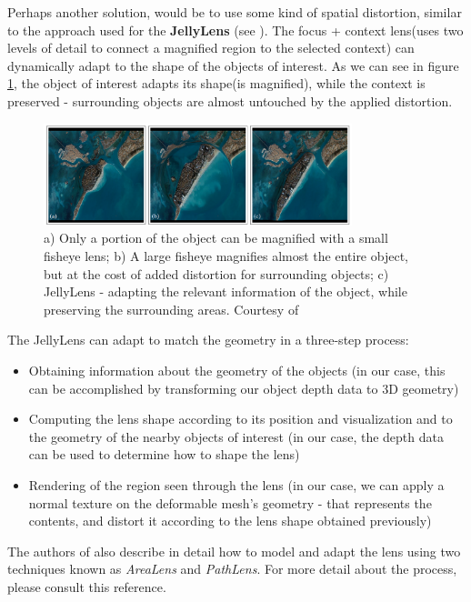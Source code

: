 \documentclass[]{article}
\begin{document}
Perhaps another solution, would be to use some kind of spatial distortion, similar to the approach used for the \textbf{JellyLens} (see \cite{pindat12}). The focus + context lens(uses two levels of detail to connect a magnified region to the selected context)  can dynamically adapt to the shape of the objects of interest. As we can see in figure  \ref{fig:JellyLens}, the object of interest adapts its shape(is magnified), while the context is preserved - surrounding objects are almost untouched by the applied distortion.

\begin{figure}[hbtp]
    \centering
    \includegraphics[width=0.8\textwidth]{figures/JellyLens.PNG}
    \caption{a) Only a portion of the object can be magnified with a small fisheye lens; b) A large fisheye magnifies almost the entire object, but at the cost of added distortion for surrounding objects; c) JellyLens - adapting the relevant information of the object, while preserving the surrounding areas. Courtesy of \cite{pindat12}}
    \label{fig:JellyLens}
\end{figure}

The JellyLens can adapt to match the geometry in a three-step process:
\begin{itemize}
\item Obtaining information about the geometry of the objects (in our case, this can be accomplished by transforming our object depth data to 3D geometry)
\item Computing the lens shape according to its position and visualization and to the geometry of the nearby objects of interest (in our case, the depth data can be used to determine how to shape the lens)
\item Rendering of the region seen through the lens (in our case, we can apply a normal texture on the deformable mesh's geometry - that represents the contents, and distort it according to the lens shape obtained previously)
\end{itemize}

The authors of \cite{pindat12} also describe in detail how to model and adapt the lens using two techniques known as \textit{AreaLens} and \textit{PathLens}. For more detail about the process, please consult this reference.\\
\end{document}
